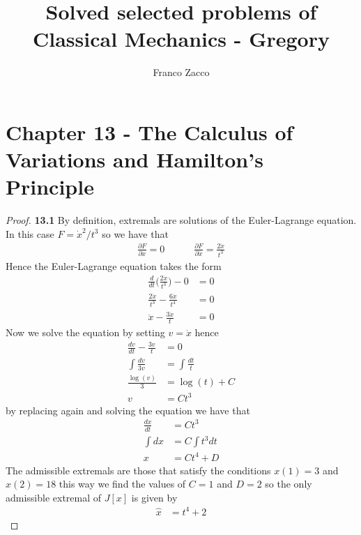 \documentclass[11pt]{article}
\title{\textbf{Solved selected problems of Classical Mechanics - Gregory}}
\author{Franco Zacco}
\date{}
\theoremstyle{definition}
\begin{document}
\maketitle
\thispagestyle{empty}

\section*{Chapter 13 - The Calculus of Variations and Hamilton's Principle}

\begin{proof}{\textbf{13.1}}
    By definition, extremals are solutions of the Euler-Lagrange equation.
    In this case $F = \dot x^2/t^3$ so we have that
    \begin{align*}
        \frac{\partial F}{\partial x} = 0 \quad\quad\quad
        \frac{\partial F}{\partial \dot x} = \frac{2\dot x}{t^3} 
    \end{align*}
    Hence the Euler-Lagrange equation takes the form
    \begin{align*}
        \frac{d}{dt}\bigg(\frac{2\dot x}{t^3}\bigg) - 0 &= 0\\
        \frac{2\ddot x}{t^3} - \frac{6\dot x}{t^4} &= 0\\
        \ddot x - \frac{3\dot x}{t} &= 0
    \end{align*}
    Now we solve the equation by setting $v = \dot x$ hence
    \begin{align*}
        \frac{dv}{dt} - \frac{3v}{t} &= 0\\
        \int\frac{dv}{3v} &= \int\frac{dt}{t}\\
        \frac{\log(v)}{3} &= \log(t) + C\\
        v &= Ct^3
    \end{align*}
    by replacing again and solving the equation we have that 
    \begin{align*}
        \frac{dx}{dt} &= Ct^3\\
        \int dx &= C\int t^3dt\\
        x &= Ct^4 + D
    \end{align*}
    The admissible extremals are those that satisfy the conditions
    $x(1) = 3$ and $x(2) = 18$ this way we find the values of
    $C = 1$ and $D = 2$ so the only admissible extremal of $J[x]$ is given by
    \begin{align*}
        \hat x &= t^4 + 2
    \end{align*}


\end{proof}
\end{document}
